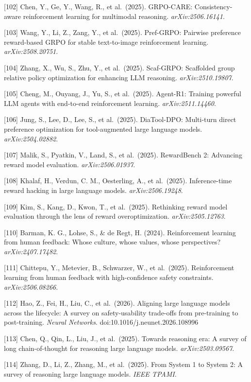 {[}102{]} Chen, Y., Ge, Y., Wang, R., et al.~(2025). GRPO-CARE: Consistency-aware reinforcement learning for multimodal reasoning. \emph{arXiv:2506.16141}.

{[}103{]} Wang, Y., Li, Z., Zang, Y., et al.~(2025). Pref-GRPO: Pairwise preference reward-based GRPO for stable text-to-image reinforcement learning. \emph{arXiv:2508.20751}.

{[}104{]} Zhang, X., Wu, S., Zhu, Y., et al.~(2025). Scaf-GRPO: Scaffolded group relative policy optimization for enhancing LLM reasoning. \emph{arXiv:2510.19807}.

{[}105{]} Cheng, M., Ouyang, J., Yu, S., et al.~(2025). Agent-R1: Training powerful LLM agents with end-to-end reinforcement learning. \emph{arXiv:2511.14460}.

{[}106{]} Jung, S., Lee, D., Lee, S., et al.~(2025). DiaTool-DPO: Multi-turn direct preference optimization for tool-augmented large language models. \emph{arXiv:2504.02882}.

{[}107{]} Malik, S., Pyatkin, V., Land, S., et al.~(2025). RewardBench 2: Advancing reward model evaluation. \emph{arXiv:2506.01937}.

{[}108{]} Khalaf, H., Verdun, C. M., Oesterling, A., et al.~(2025). Inference-time reward hacking in large language models. \emph{arXiv:2506.19248}.

{[}109{]} Kim, S., Kang, D., Kwon, T., et al.~(2025). Rethinking reward model evaluation through the lens of reward overoptimization. \emph{arXiv:2505.12763}.

{[}110{]} Barman, K. G., Lohse, S., \& de Regt, H. (2024). Reinforcement learning from human feedback: Whose culture, whose values, whose perspectives? \emph{arXiv:2407.17482}.

{[}111{]} Chittepu, Y., Metevier, B., Schwarzer, W., et al.~(2025). Reinforcement learning from human feedback with high-confidence safety constraints. \emph{arXiv:2506.08266}.

{[}112{]} Hao, Z., Fei, H., Liu, C., et al.~(2026). Aligning large language models across the lifecycle: A survey on safety-usability trade-offs from pre-training to post-training. \emph{Neural Networks}. doi:10.1016/j.neunet.2026.108996

{[}113{]} Chen, Q., Qin, L., Liu, J., et al.~(2025). Towards reasoning era: A survey of long chain-of-thought for reasoning large language models. \emph{arXiv:2503.09567}.

{[}114{]} Zhang, D., Li, Z., Zhang, M., et al.~(2025). From System 1 to System 2: A survey of reasoning large language models. \emph{IEEE TPAMI}.


